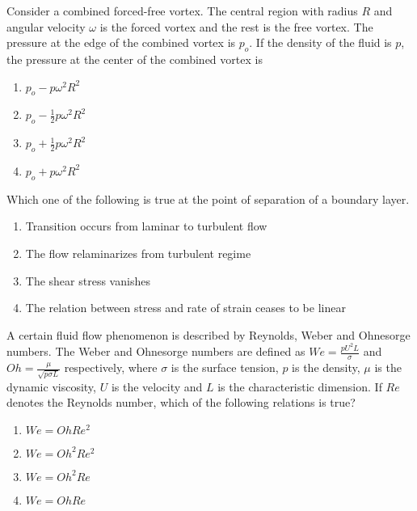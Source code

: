     \item Consider a combined forced-free vortex. The central region with radius $R$ and angular velocity $\omega$ is the forced vortex and the rest is the free vortex. The pressure at the edge of the combined vortex is $p_o$. If the density of the fluid is $p$, the pressure at the center of the combined vortex is
    \begin{multicols}{4}
        \begin{enumerate}
            \item $p_o - p\omega^2 R^2$
            \item $p_o - \frac{1}{2}p\omega^2 R^2$
            \item $p_o + \frac{1}{2}p\omega^2 R^2$
            \item $p_o + p\omega^2 R^2$
        \end{enumerate}
    \end{multicols}

    \item Which one of the following is true at the point of separation of a boundary layer.
    \begin{enumerate}
        \item Transition occurs from laminar to turbulent flow
        \item The flow relaminarizes from turbulent regime
        \item The shear stress vanishes
        \item The relation between stress and rate of strain ceases to be linear
    \end{enumerate}

    \item A certain fluid flow phenomenon is described by Reynolds, Weber and Ohnesorge numbers. The Weber and Ohnesorge numbers are defined as $We = \frac{pU^2L}{\sigma}$ and $Oh =\frac{\mu}{\sqrt{p\sigma L}} $ respectively, where $\sigma$ is the surface tension, $p$ is the density, $\mu$ is the dynamic viscosity, $U$ is the velocity and $L$ is the characteristic dimension. If $Re$ denotes the Reynolds number, which of the following relations is true?
    \begin{multicols}{4}
        \begin{enumerate}
            \item $We=Oh Re^2$
            \item $We=Oh^2 Re^2$
            \item $We=Oh^2 Re$
            \item $We=Oh Re$
        \end{enumerate}
    \end{multicols}

